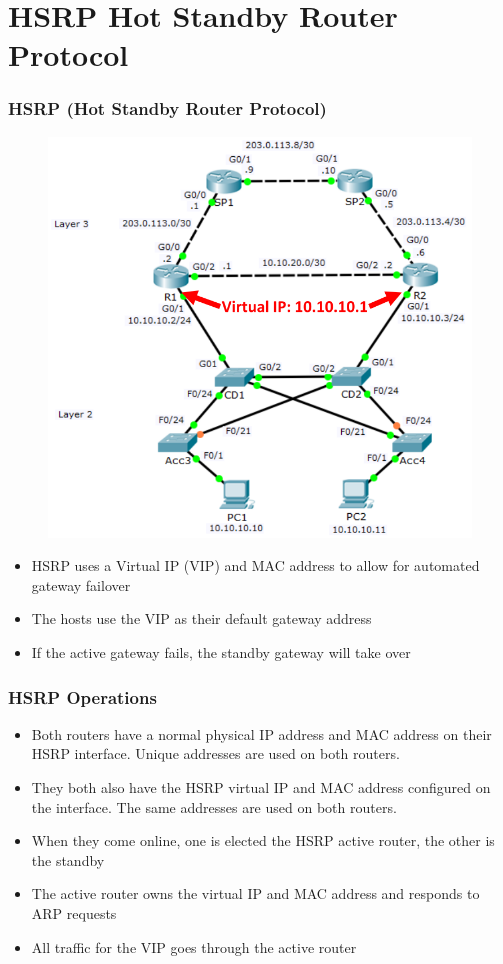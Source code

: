 \documentclass[pdflatex,compress,mathserif]{beamer}
\begin{document}
\section{HSRP Hot Standby Router Protocol}

\begin{frame}
	\frametitle{HSRP (Hot Standby Router Protocol)}
	\begin{multicols}{2}
		\begin{figure}
			\centering
			\includegraphics[width=\linewidth]{img/img11}
		\end{figure}
		\columnbreak
		\begin{itemize}
			\item HSRP uses a Virtual IP (VIP) and
MAC address to allow for
automated gateway failover
			\item The hosts use the VIP as their
default gateway address
			\item If the active gateway fails, the
standby gateway will take over
		\end{itemize}
	\end{multicols}
\end{frame}

\begin{frame}
	\frametitle{HSRP Operations}
	\begin{itemize}
		\item Both routers have a normal physical IP address and MAC address on their
HSRP interface. Unique addresses are used on both routers.
		\item They both also have the HSRP virtual IP and MAC address configured on
the interface. The same addresses are used on both routers.
		\item When they come online, one is elected the HSRP active router, the other is
the standby
		\item The active router owns the virtual IP and MAC address and responds to
ARP requests
		\item All traffic for the VIP goes through the active router
	\end{itemize}
\end{frame}
\end{document}
